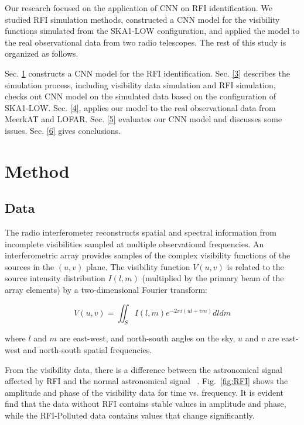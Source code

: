 \documentclass[usenatbib]{mnras}
\begin{document}
Our research focused on the application of CNN on RFI identification. We studied RFI simulation methods, constructed a CNN model for the visibility functions simulated from the SKA1-LOW configuration, and applied the model to the real observational data from two radio telescopes. The rest of this study is organized as follows.

Sec. \ref{2} constructs a CNN model for the RFI identification. Sec. \ref{3} describes the simulation process, including visibility data simulation and RFI simulation, checks out CNN model on the simulated data based on the configuration of SKA1-LOW. Sec. \ref{4}, applies our model to the real observational data from MeerkAT and LOFAR. Sec. \ref{5} evaluates our CNN model and discusses some issues. Sec. \ref{6} gives conclusions.

\section{Method}
\label{2}

\subsection{Data}
\label{method}
The radio interferometer reconstructs spatial and spectral information from incomplete visibilities sampled at multiple observational frequencies. An interferometric array provides samples of the complex visibility functions of the sources in the $(u,v)$ plane\citep{cornwell1999deconvolution}. The visibility function $V(u,v)$ is related to the source intensity distribution $I(l,m)$ (multiplied by the primary beam of the array elements) by a two-dimensional Fourier transform:

\begin{equation}\label{fun1}
V(u, v)=\iint_{S} I(l, m) e^{-2 \pi i(u l+v m)} d l d m 
\end{equation}

where $l$ and $m$ are east-west, and north-south angles on the sky, $u$ and $v$ are east-west and north-south spatial frequencies.

From the visibility data, there is a difference between the astronomical signal affected by RFI and the normal astronomical signal
~\citep{baan2011rfi}. Fig.~\ref{fig:RFI} shows the amplitude and phase of the visibility data for time vs. frequency. It is evident find that the data without RFI contains stable values in amplitude and phase, while the RFI-Polluted data contains values that change significantly. 
\end{document}
